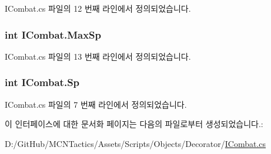 I\+Combat.\+cs 파일의 12 번째 라인에서 정의되었습니다.

\subsubsection[{\texorpdfstring{Max\+Sp}{MaxSp}}]{\setlength{\rightskip}{0pt plus 5cm}int I\+Combat.\+Max\+Sp\hspace{0.3cm}{\ttfamily [get]}}\hypertarget{interface_i_combat_ab40a631d18b8bff65e84be84f0061708}{}\label{interface_i_combat_ab40a631d18b8bff65e84be84f0061708}


I\+Combat.\+cs 파일의 13 번째 라인에서 정의되었습니다.

\subsubsection[{\texorpdfstring{Sp}{Sp}}]{\setlength{\rightskip}{0pt plus 5cm}int I\+Combat.\+Sp\hspace{0.3cm}{\ttfamily [get]}}\hypertarget{interface_i_combat_a833ef74923f764476c432b48be18ac90}{}\label{interface_i_combat_a833ef74923f764476c432b48be18ac90}


I\+Combat.\+cs 파일의 7 번째 라인에서 정의되었습니다.



이 인터페이스에 대한 문서화 페이지는 다음의 파일로부터 생성되었습니다.\+:\begin{DoxyCompactItemize}
\item 
D\+:/\+Git\+Hub/\+M\+C\+N\+Tactics/\+Assets/\+Scripts/\+Objects/\+Decorator/\hyperlink{_i_combat_8cs}{I\+Combat.\+cs}\end{DoxyCompactItemize}
